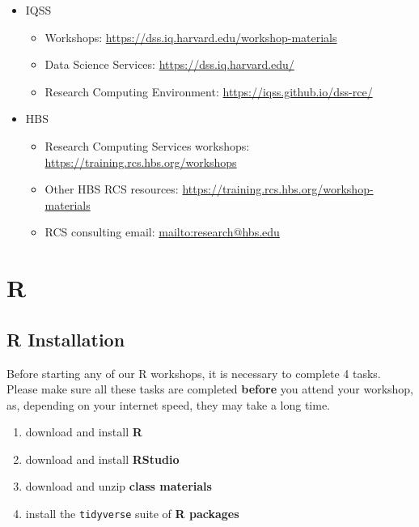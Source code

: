 \documentclass[]{book}
\providecommand{\tightlist}{%
  \setlength{\itemsep}{0pt}\setlength{\parskip}{0pt}}
\begin{document}
\begin{itemize}
\tightlist
\item
  IQSS

  \begin{itemize}
  \tightlist
  \item
    Workshops: \url{https://dss.iq.harvard.edu/workshop-materials}
  \item
    Data Science Services: \url{https://dss.iq.harvard.edu/}
  \item
    Research Computing Environment:
    \url{https://iqss.github.io/dss-rce/}
  \end{itemize}
\item
  HBS

  \begin{itemize}
  \tightlist
  \item
    Research Computing Services workshops:
    \url{https://training.rcs.hbs.org/workshops}
  \item
    Other HBS RCS resources:
    \url{https://training.rcs.hbs.org/workshop-materials}
  \item
    RCS consulting email: \url{mailto:research@hbs.edu}
  \end{itemize}
\end{itemize}

\part{R}\label{part-r}

\chapter{R Installation}\label{r-installation}

Before starting any of our R workshops, it is necessary to complete 4
tasks. Please make sure all these tasks are completed \textbf{before}
you attend your workshop, as, depending on your internet speed, they may
take a long time.

\begin{enumerate}
\def\labelenumi{\arabic{enumi}.}
\tightlist
\item
  download and install \textbf{R}
\item
  download and install \textbf{RStudio}
\item
  download and unzip \textbf{class materials}
\item
  install the \texttt{tidyverse} suite of \textbf{R packages}
\end{enumerate}
\end{document}
